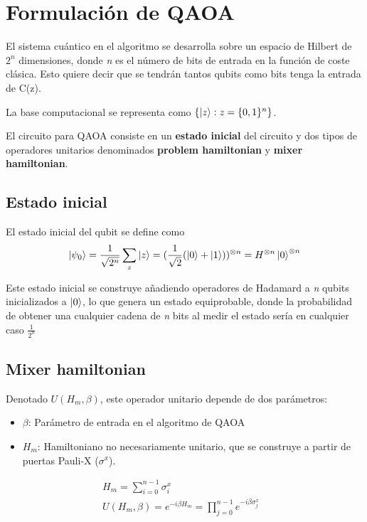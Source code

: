 \documentclass{article}
\begin{document}
\section{Formulación de QAOA}
El sistema cuántico en el algoritmo se desarrolla sobre un espacio de Hilbert de $2^n$ dimensiones, donde \textit{n} es el número de bits de entrada en la función de coste clásica. Esto quiere decir que se tendrán tantos qubits como bits tenga la entrada de C(z).

La base computacional se representa como $\{\ket{z} : z = \{0, 1\}^n\}$.

El circuito para QAOA consiste en un \textbf{estado inicial} del circuito y dos tipos de operadores unitarios denominados \textbf{problem hamiltonian} y \textbf{mixer hamiltonian}.

\subsection{Estado inicial}
El estado inicial del qubit se define como
\begin{align*}
  \ket{\psi_0} = \frac{1}{\sqrt{2^n}} \sum_z\ket{z}
  = (\frac{1}{\sqrt{2}} (\ket{0} + \ket{1}))^{\otimes n}
  = H^{\otimes n} \ket{0}^{\otimes n}
\end{align*}

Este estado inicial se construye añadiendo operadores de Hadamard a \textit{n} qubits inicializados a $\ket{0}$, lo que genera un estado equiprobable, donde la probabilidad de obtener una cualquier cadena de \textit{n} bits al medir el estado sería en cualquier caso $\frac{1}{2^n}$

\subsection{Mixer hamiltonian}

Denotado $U(H_m, \beta)$, este operador unitario depende de dos parámetros:
\begin{itemize}
\item $\beta$: Parámetro de entrada en el algoritmo de QAOA  %
\item $H_m$: Hamiltoniano no necesariamente unitario, que se construye a partir de puertas Pauli-X ($\sigma^x$).  %
\end{itemize}

\begin{align*}
  &H_m = \sum_{i=0}^{n-1}\sigma^x_{i} &&\\
  &U(H_m, \beta) = e^{-i \beta H_m} = \prod_{j=0}^{n-1}e^{-i \beta \sigma^x_j}
\end{align*}
\end{document}
